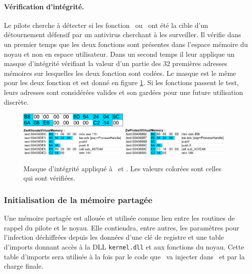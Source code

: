 \paragraph{Vérification d'intégrité.}
Le pilote cherche à détecter si les fonction \ZwA\ ou \ZwP\ ont été la cible d'un détournement défensif par un antivirus cherchant à les surveiller.
Il vérifie dans un premier temps que les deux fonctions sont présentes dans l'espace mémoire du noyau et non en espace utilisateur.
Dans un second temps il leur applique un masque d'intégrité vérifiant la valeur d'un partie des 32 premières adresses mémoires sur lesquelles les deux fonction sont codées. Le masque est le même pour les deux fonction et est donné en figure \ref{fig:masque_integrite}.
Si les fonctions passent le test, leurs adresses sont considérées valides et son gardées pour une future utilisation discrète.

\begin{figure}
\begin{center}
 \includegraphics[width=0.48\textwidth]{supports/duqu/octetsmasque.png}\\
 \includegraphics[width=0.48\textwidth]{supports/duqu/masqueZwAllocate.png}
 \includegraphics[width=0.48\textwidth]{supports/duqu/masqueZwProtect.png}
\end{center}
\caption{Masque d'intégrité appliqué à \ZwA\ et \ZwP. Les valeurs colorées sont celles qui sont vérifiées.}
\label{fig:masque_integrite}
\end{figure}

\subsubsection{Initialisation de la mémoire partagée}
Une mémoire partagée est allouée et utilisée comme lien entre les routines de rappel du pilote et le noyau.
Elle contiendra, entre autres, les paramètres pour l'infection déchiffrées depuis les données d'une clé de registre et une table d'imports donnant accès à la DLL \texttt{kernel.dll} et aux fonctions du noyau.
Cette table d'imports sera utilisée à la fois par le code que \duqu\ va injecter dans \services\ et par la charge finale.

